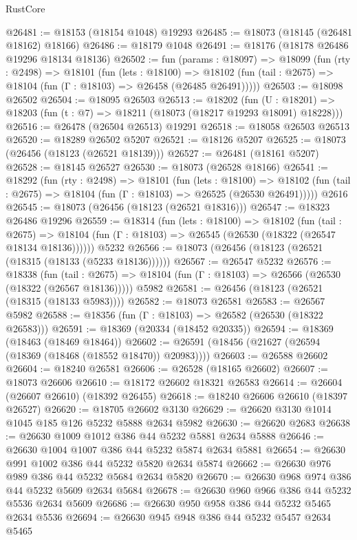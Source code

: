 \begin{lexlean}{RustCore}
\begin{coremodule}
@26481 := @18153 (@18154 @1048) @19293
@26485 := @18073 (@18145 (@26481 @18162) @18166)
@26486 := @18179 @1048
@26491 := @18176 (@18178 @26486 @19296 @18134 @18136)
@26502 := fun (params : @18097) =>
  @18099
    (fun (rty : @2498) =>
    @18101
      (fun (lets : @18100) =>
      @18102 (fun (tail : @2675) => @18104 (fun (Γ : @18103) => @26458 (@26485 @26491)))))
@26503 := @18098 @26502
@26504 := @18095 @26503
@26513 := @18202
    (fun (U : @18201) => @18203 (fun (t : @7) => @18211 (@18073 (@18217 @19293 @18091) @18228)))
@26516 := @26478 (@26504 @26513) @19291
@26518 := @18058 @26503 @26513
@26520 := @18289 @26502 @5207
@26521 := @18126 @5207
@26525 := @18073 (@26456 (@18123 (@26521 @18139)))
@26527 := @26481 (@18161 @5207)
@26528 := @18145 @26527
@26530 := @18073 (@26528 @18166)
@26541 := @18292
    (fun (rty : @2498) =>
    @18101
      (fun (lets : @18100) =>
      @18102 (fun (tail : @2675) => @18104 (fun (Γ : @18103) => @26525 (@26530 @26491)))))
    @2616
@26545 := @18073 (@26456 (@18123 (@26521 @18316)))
@26547 := @18323 @26486 @19296
@26559 := @18314
    (fun (lets : @18100) =>
    @18102
      (fun (tail : @2675) =>
      @18104 (fun (Γ : @18103) => @26545 (@26530 (@18322 (@26547 @18134 @18136))))))
    @5232
@26566 := @18073 (@26456 (@18123 (@26521 (@18315 (@18133 (@5233 @18136))))))
@26567 := @26547 @5232
@26576 := @18338
    (fun (tail : @2675) => @18104 (fun (Γ : @18103) => @26566 (@26530 (@18322 (@26567 @18136)))))
    @5982
@26581 := @26456 (@18123 (@26521 (@18315 (@18133 @5983))))
@26582 := @18073 @26581
@26583 := @26567 @5982
@26588 := @18356 (fun (Γ : @18103) => @26582 (@26530 (@18322 @26583)))
@26591 := @18369 (@20334 (@18452 @20335))
@26594 := @18369 (@18463 (@18469 @18464))
@26602 := @26591 (@18456 (@21627 (@26594 (@18369 (@18468 (@18552 @18470)) @20983))))
@26603 := @26588 @26602
@26604 := @18240 @26581
@26606 := @26528 (@18165 @26602)
@26607 := @18073 @26606
@26610 := @18172 @26602 @18321 @26583
@26614 := @26604 (@26607 @26610) (@18392 @26455)
@26618 := @18240 @26606 @26610 (@18397 @26527)
@26620 := @18705 @26602 @3130
@26629 := @26620 @3130 @1014 @1045 @185 @126 @5232 @5888 @2634 @5982
@26630 := @26620 @2683
@26638 := @26630 @1009 @1012 @386 @44 @5232 @5881 @2634 @5888
@26646 := @26630 @1004 @1007 @386 @44 @5232 @5874 @2634 @5881
@26654 := @26630 @991 @1002 @386 @44 @5232 @5820 @2634 @5874
@26662 := @26630 @976 @989 @386 @44 @5232 @5684 @2634 @5820
@26670 := @26630 @968 @974 @386 @44 @5232 @5609 @2634 @5684
@26678 := @26630 @960 @966 @386 @44 @5232 @5536 @2634 @5609
@26686 := @26630 @950 @958 @386 @44 @5232 @5465 @2634 @5536
@26694 := @26630 @945 @948 @386 @44 @5232 @5457 @2634 @5465

\end{coremodule}
\end{lexlean}
